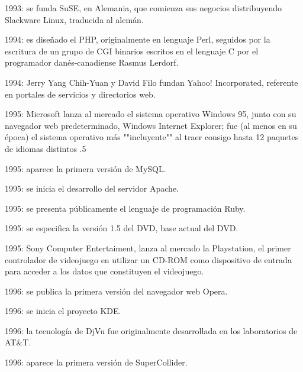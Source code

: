 \documentclass{article}
\begin{document}
{    \item 1993: se funda SuSE, en Alemania, que comienza sus negocios distribuyendo Slackware Linux, traducida al alemán.
    \item 1994: es diseñado el PHP, originalmente en lenguaje Perl, seguidos por la escritura de un grupo de CGI binarios escritos en el lenguaje C por el programador danés-canadiense Rasmus Lerdorf.
    \item 1994: Jerry Yang Chih-Yuan y David Filo fundan Yahoo! Incorporated, referente en portales de servicios y directorios web.
    \item 1995: Microsoft lanza al mercado el sistema operativo Windows 95, junto con su navegador web predeterminado, Windows Internet Explorer; fue (al menos en su época) el sistema operativo más ""incluyente"" al traer consigo hasta 12 paquetes de idiomas distintos .5​
    \item 1995: aparece la primera versión de MySQL.
    \item 1995: se inicia el desarrollo del servidor Apache.
    \item 1995: se presenta públicamente el lenguaje de programación Ruby.
    \item 1995: se especifica la versión 1.5 del DVD, base actual del DVD.
    \item 1995: Sony Computer Entertaiment, lanza al mercado la Playstation, el primer controlador de videojuego en utilizar un CD-ROM como dispositivo de entrada para acceder a los datos que constituyen el videojuego.
    \item 1996: se publica la primera versión del navegador web Opera.
    \item 1996: se inicia el proyecto KDE.
    \item 1996: la tecnología de DjVu fue originalmente desarrollada en los laboratorios de AT&T.
    \item 1996: aparece la primera versión de SuperCollider.
}
\end{document}
